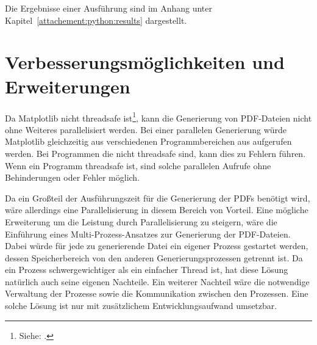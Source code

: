 Die Ergebnisse einer Ausführung sind im Anhang unter Kapitel~\ref{attachement:python:results} dargestellt.

\section{Verbesserungsmöglichkeiten und Erweiterungen}
Da Matplotlib nicht threadsafe ist\footnote{ Siehe: \cite{Stackoverflow2016}.}, kann die Generierung von PDF-Dateien nicht ohne Weiteres parallelisiert werden.
Bei einer parallelen Generierung würde Matplotlib gleichzeitig aus verschiedenen Programmbereichen aus aufgerufen werden.
Bei Programmen die nicht threadsafe sind, kann dies zu Fehlern führen.
Wenn ein Programm threadsafe ist, sind solche parallelen Aufrufe ohne Behinderungen oder Fehler möglich.

Da ein Großteil der Ausführungszeit für die Generierung der PDFs benötigt wird, wäre allerdings eine Parallelisierung in diesem Bereich von Vorteil.
Eine mögliche Erweiterung um die Leistung durch Parallelisierung zu steigern, wäre die Einführung eines Multi-Prozess-Ansatzes zur Generierung der PDF-Dateien.
Dabei würde für jede zu generierende Datei ein eigener Prozess gestartet werden, dessen Speicherbereich von den anderen Generierungsprozessen getrennt ist.
Da ein Prozess schwergewichtiger als ein einfacher Thread ist, hat diese Lösung natürlich auch seine eigenen Nachteile.
Ein weiterer Nachteil wäre die notwendige Verwaltung der Prozesse sowie die Kommunikation zwischen den Prozessen.
Eine solche Lösung ist nur mit zusätzlichem Entwicklungsaufwand umsetzbar.